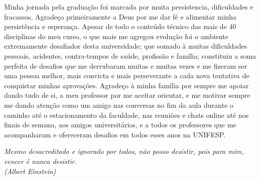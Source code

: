 \documentclass[	12pt, Times, openright, twoside, a4paper, english, brazil]{abntex2}
\begin{document}
\begin{agradecimentos}
Minha jornada pela graduação foi marcada por muita persistencia, dificuldades e fracassos. Agradeço primeiramente a Deus por me dar fé e alimentar minha persistência e esperança. Apesar de todo o conteúdo técnico das mais de 40 disciplinas do meu curso, o que mais me agregou evolução foi o ambiente extremamente desafiador desta universidade; que somado à muitas dificuldades pessoais, acidentes, contra-tempos de saúde, profissão e família; constituiu a soma perfeita de desafios que me derrubaram muitas e muitas vezes e me fizeram ser uma pessoa melhor, mais convicta e mais perseverante a cada nova tentativa de conquistar minhas aprovações. Agradeço à minha família por sempre me apoiar dando tudo de si, a meu professor por me aceitar orientar, e me motivar sempre me dando atenção como um amigo nas conversas no fim da aula durante o caminho até o estacionamento da faculdade, nas reuniões e chats online até nos finais de semana, aos amigos universitários, e a todos os professores que me acompanharam e ofereceram desafios em todos esses anos na UNIFESP. 

\end{agradecimentos}

\begin{epigrafe}
    \vspace*{\fill}
	\begin{flushright}
		\textit{Mesmo desacreditado e ignorado por todos, não posso desistir, pois para mim, vencer é nunca desistir.\\
		(Albert Einstein)}
	\end{flushright}
\end{epigrafe}

\end{document}

